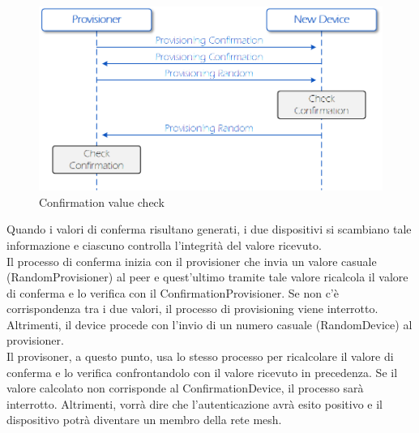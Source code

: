 \begin{figure}[!ht]
    \centering
    \includegraphics[width = \textwidth]{images/Provisioning_confirmation_value_check.png}
    \caption{Confirmation value check}
    \label{fig:provisioning_confirmation_value_check}
\end{figure}

\noindent Quando i valori di conferma risultano generati, i due dispositivi si scambiano tale informazione e ciascuno controlla l'integrità del valore ricevuto.\\
Il processo di conferma inizia con il provisioner che invia un valore casuale (RandomProvisioner) al peer e quest'ultimo tramite tale valore ricalcola il valore di conferma e lo verifica con il ConfirmationProvisioner. Se non c'è corrispondenza tra i due valori, il processo di provisioning viene interrotto. Altrimenti, il device procede con l'invio di un numero casuale (RandomDevice) al provisioner.\\
Il provisoner, a questo punto, usa lo stesso processo per ricalcolare il valore di conferma e lo verifica confrontandolo con il valore ricevuto in precedenza. Se il valore calcolato non corrisponde al ConfirmationDevice, il processo sarà interrotto. Altrimenti, vorrà dire che l'autenticazione avrà esito positivo e il dispositivo potrà diventare un membro della rete mesh.

